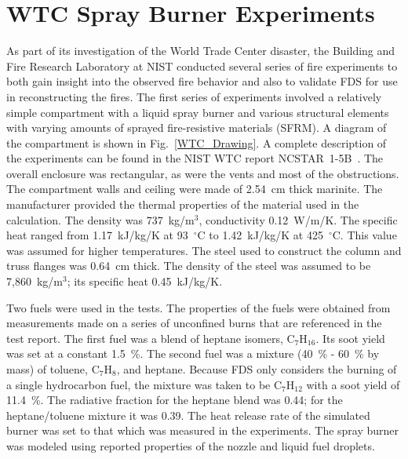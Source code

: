 \section{WTC Spray Burner Experiments}

As part of its investigation of the World Trade Center disaster, the Building and Fire Research Laboratory at NIST conducted several series of fire experiments to both gain insight into the observed fire behavior and also to validate FDS for use in reconstructing the fires. The first series of experiments involved a relatively simple compartment with a liquid spray burner and various structural elements with varying amounts of sprayed fire-resistive materials (SFRM). A diagram of the compartment is shown in Fig.~\ref{WTC_Drawing}. A complete description of the experiments can be found in the NIST WTC report NCSTAR~1-5B~\cite{NIST_NCSTAR_1-5B}. The overall enclosure was rectangular, as were the vents and most of the obstructions. The compartment walls and ceiling were made of 2.54~cm thick marinite. The manufacturer provided the thermal properties of the material used in the calculation. The density was 737~kg/m$^3$, conductivity 0.12~W/m/K. The specific heat ranged from 1.17~kJ/kg/K at 93~$^\circ$C to 1.42~kJ/kg/K at 425~$^\circ$C. This value was assumed for higher temperatures. The steel used to construct the column and truss flanges was 0.64~cm thick.  The density of the steel was assumed to be 7,860~kg/m$^3$; its specific heat 0.45~kJ/kg/K.

Two fuels were used in the tests. The properties of the fuels were obtained from measurements made on a series of unconfined burns that are referenced in the test report. The first fuel was a blend of heptane isomers, C$_7$H$_{16}$. Its soot yield was set at a constant 1.5~\%. The second fuel was a mixture (40~\% - 60~\% by mass) of toluene, C$_7$H$_8$, and heptane. Because FDS only considers the burning of a single hydrocarbon fuel, the mixture was taken to be C$_7$H$_{12}$ with a soot yield of 11.4~\%. The radiative fraction for the heptane blend was 0.44; for the heptane/toluene mixture it was 0.39. The heat release rate of the simulated burner was set to that which was measured in the experiments. The spray burner was modeled using reported properties of the nozzle and liquid fuel droplets.

